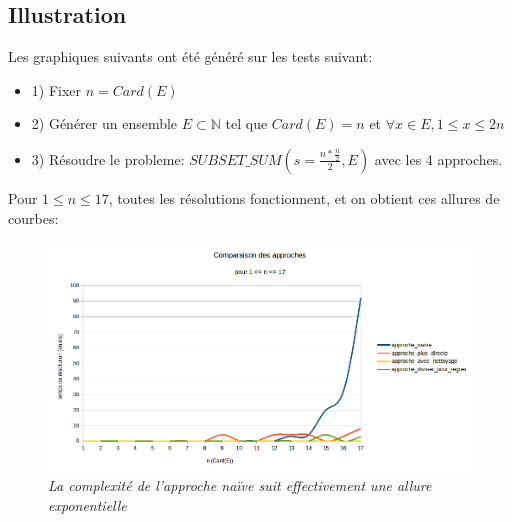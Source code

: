 \documentclass[10pt]{article}
\begin{document}
			\subsection{Illustration}\label{illustrations}
			
				Les graphiques suivants ont été généré sur les tests suivant:
				\begin{itemize}[label=-]
					\setlength\itemsep{0.1em}
					\item 1) Fixer $n = Card(E)$
					\item 2) Générer un ensemble $E \subset \mathbb{N}$ tel que $Card(E) = n$ et $\forall x \in E, 1 \leq x \leq 2n$
					\item 3) Résoudre le probleme: $SUBSET\_SUM(s = \frac{n * \frac{n}{2}}{2}, E)$ avec les 4 approches.
				\end{itemize}
				
				Pour $1 \leq n \leq 17$, toutes les résolutions fonctionnent, et on obtient ces allures de courbes:
				
				\begin{figure}[H]
					\includegraphics[width=16cm]{./images/cmp_n_1_17.png}
					\caption{\textit{La complexité de l'approche naïve suit effectivement une allure exponentielle}}
				\end{figure}
\end{document}
